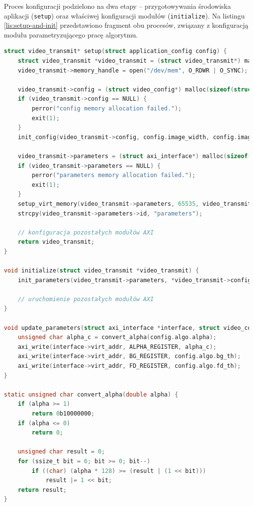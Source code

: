 Proces konfiguracji podzielono na dwa etapy -- przygotowywania środowiska aplikacji (\texttt{setup}) oraz właściwej konfiguracji modułów (\texttt{initialize}). 
Na listingu \ref{lis:setup-and-init} przedstawiono fragment obu procesów, związany z konfiguracją modułu parametryzującego pracę algorytmu.

\begin{lstlisting}[breaklines,language=C, label=lis:setup-and-init, caption=Konfiguracja modułu parametryzuącego pracę algorytmu.]
struct video_transmit* setup(struct application_config config) {
	struct video_transmit *video_transmit = (struct video_transmit*) malloc(sizeof(struct video_transmit));
	video_transmit->memory_handle = open("/dev/mem", O_RDWR | O_SYNC);
		
	video_transmit->config = (struct video_config*) malloc(sizeof(struct video_config));
	if (video_transmit->config == NULL) {
		perror("config memory allocation failed.");
		exit(1);
	}
	init_config(video_transmit->config, config.image_width, config.image_height, config.alpha, config.bg_th, config.fd_th);
	
	video_transmit->parameters = (struct axi_interface*) malloc(sizeof(struct axi_interface));
	if (video_transmit->parameters == NULL) {
		perror("parameters memory allocation failed.");
		exit(1);
	}
	setup_virt_memory(video_transmit->parameters, 65535, video_transmit->memory_handle, algorithm_parameters_addr);
	strcpy(video_transmit->parameters->id, "parameters");
	
	// konfiguracja pozostałych modułów AXI
	return video_transmit;
}

void initialize(struct video_transmit *video_transmit) {
	init_parameters(video_transmit->parameters, *video_transmit->config);
	
	// uruchomienie pozostałych modułów AXI
}

void update_parameters(struct axi_interface *interface, struct video_config config) {
	unsigned char alpha_c = convert_alpha(config.algo.alpha);
	axi_write(interface->virt_addr, ALPHA_REGISTER, alpha_c);
	axi_write(interface->virt_addr, BG_REGISTER, config.algo.bg_th);
	axi_write(interface->virt_addr, FD_REGISTER, config.algo.fd_th);
}

static unsigned char convert_alpha(double alpha) {
	if (alpha >= 1)
		return 0b10000000;
	if (alpha <= 0)
		return 0;
	
	unsigned char result = 0;
	for (ssize_t bit = 6; bit >= 0; bit--)
		if ((char) (alpha * 128) >= (result | (1 << bit)))
			result |= 1 << bit;
	return result;
}
\end{lstlisting}

